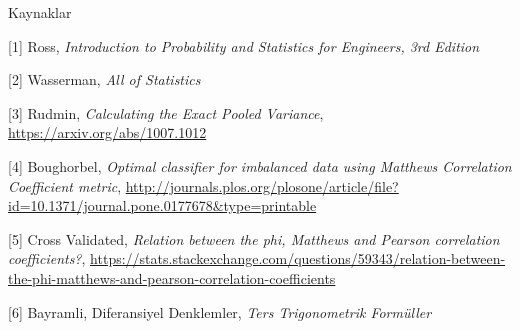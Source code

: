 \documentclass[12pt,fleqn]{article}\usepackage{../../common}
\begin{document}
Kaynaklar

[1] Ross, {\em Introduction to Probability and Statistics for Engineers, 3rd Edition}

[2] Wasserman, {\em All of Statistics}

[3] Rudmin, {\em Calculating the Exact Pooled Variance},
    \url{https://arxiv.org/abs/1007.1012}

[4] Boughorbel, {\em Optimal classifier for imbalanced data using Matthews Correlation Coefficient metric}, \url{http://journals.plos.org/plosone/article/file?id=10.1371/journal.pone.0177678&type=printable}

[5] Cross Validated, {\em Relation between the phi, Matthews and Pearson correlation coefficients?}, \url{https://stats.stackexchange.com/questions/59343/relation-between-the-phi-matthews-and-pearson-correlation-coefficients}

[6] Bayramli, Diferansiyel Denklemler, {\em Ters Trigonometrik Formüller}
\end{document}
